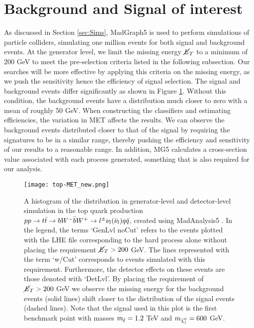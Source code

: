 \section{Background and Signal of interest}
\label{sec:production}
As discussed in Section \ref{sec:Sims}, MadGraph5 is used to perform simulations of particle colliders, simulating one million events for both signal and background events. At the generator level, we limit the missing energy $\cancel{\it{E}}_{T}$ to a minimum of 200 GeV to meet the pre-selection criteria listed in the following subsection. Our searches will be more effective by applying this criteria on the missing energy, as we push the sensitivity hence the efficiency of signal selection. The signal and background events differ significantly as shown in Figure \ref{fig:topMET}. Without this condition, the background events have a distribution much closer to zero with a mean of roughly 50 GeV. When constructing the classifiers and estimating efficiencies, the variation in MET affects the results. We can observe the background events distributed closer to that of the signal by requiring the signatures to be in a similar range, thereby pushing the efficiency and sensitivity of our results to a reasonable range. In addition, MG5 calculates a cross-section value associated with each process generated, something that is also required for our analysis. \\

\begin{figure}[htbp]
    \centering
    \texttt{[image: top-MET\_new.png]}
    \caption{A histogram of the distribution in generator-level and detector-level simulation in the top quark production $pp \rightarrow t\Bar{t} \rightarrow bW^{-}\Bar{b}W^{+} \rightarrow l^{\pm}\nu_l(\Bar{\nu}_l)q\Bar{q}$, created using MadAnalysis5 \cite{conte2013madanalysis, conte2014designing, dumont2015toward}. In the legend, the terms `GenLvl noCut' refers to the events plotted with the LHE file corresponding to the hard process alone without placing the requirement $\cancel{\it{E}}_{T}>200$ GeV. The lines represented with the term `w/Cut' corresponds to events simulated with this requirement. Furthermore, the detector effects on these events are those denoted with `DetLvl'. By placing the requirement of $\cancel{\it{E}}_{T}>200$ GeV we observe the missing energy for the background events (solid lines) shift closer to the distribution of the signal events (dashed lines). Note that the signal used in this plot is the first benchmark point with masses $m_{\Tilde{t}} = 1.2$ TeV and $m_{\Tilde{\chi}_1^0} = 600$ GeV.}
    \label{fig:topMET}
\end{figure}

